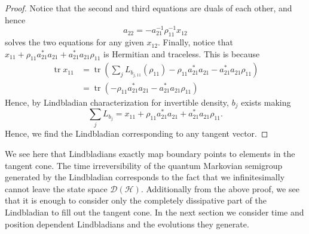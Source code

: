 \documentclass[11pt,reqno]{amsart}
\theoremstyle{definition}
\newcommand{\mc}{\mathcal}
\newcommand{\lpara}{\left(}
\newcommand{\rpara}{\right)}
\newcommand{\inv}{^{-1}}
\DeclareMathOperator{\tr}{tr}
\begin{document}
\begin{proof}
    Notice that the second and third equations are duals of each other, and hence 
    $$a_{22}=-a_{21}\inv\rho_{11}\inv x_{12}$$ solves the two equations for any given $x_{12}$.
    Finally, notice that $x_{11}+\rho_{11}a_{21}^*a_{21}+a_{21}^*a_{21}\rho_{11}$ is Hermitian and traceless. This is because
    \begin{equation*}
    \begin{aligned}
        \tr x_{11} &= \tr\lpara\sum_j L_{b_{j,11}}(\rho_{11}) -\rho_{11}a_{21}^*a_{21}-a_{21}^*a_{21}\rho_{11}\rpara\\
        &= \tr \lpara-\rho_{11}a_{21}^*a_{21}-a_{21}^*a_{21}\rho_{11}\rpara
    \end{aligned}
    \end{equation*}
    Hence, by Lindbladian characterization for invertible density, $b_j$ exists making 
    $$\sum_j L_{b_j}=x_{11}+\rho_{11}a_{21}^*a_{21}+a_{21}^*a_{21}\rho_{11}.$$
    Hence, we find the Lindbladian corresponding to any tangent vector.
\end{proof}

We see here that Lindbladians exactly map boundary points to elements in the tangent cone. The time irreversibility of the quantum Markovian semigroup generated by the Lindbladian corresponds to the fact that we infinitesimally cannot leave the state space $\mc D(\mc{H})$. Additionally from the above proof, we see that it is enough to consider only the completely dissipative part of the Lindbladian to fill out the tangent cone. In the next section we consider time and position dependent Lindbladians and the evolutions they generate. 
\end{document}
